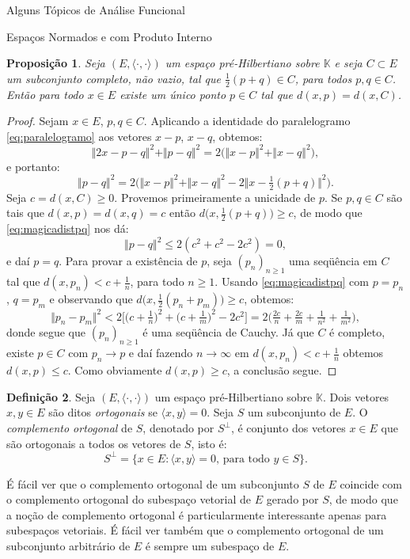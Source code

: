 \documentclass[oneside,final,11pt]{amsbook}
\newcommand{\K}{\mathds K}
\theoremstyle{remark}\newtheorem{exercise}{Exercício}[chapter]
\theoremstyle{remark}\newtheorem{*exercise}[exercise]{\hbox to 0pt{\hskip 0pt minus 1fil*}Exercício}
\theoremstyle{definition}\newtheorem{exdefin}{Definição}[chapter]
\theoremstyle{plain}\newtheorem{teo}{Teorema}[section]
\theoremstyle{plain}\newtheorem{lem}[teo]{Lema}
\theoremstyle{plain}\newtheorem{prop}[teo]{Proposição}
\theoremstyle{plain}\newtheorem{cor}[teo]{Corolário}
\theoremstyle{definition}\newtheorem{defin}[teo]{Definição}
\theoremstyle{remark}\newtheorem{rem}[teo]{Observação}
\theoremstyle{definition}\newtheorem{notation}[teo]{Notação}
\theoremstyle{definition}\newtheorem{convention}[teo]{Convenção}
\theoremstyle{definition}\newtheorem{example}[teo]{Exemplo}
\numberwithin{section}{chapter}
\numberwithin{equation}{section}
\begin{document}
\begin{chapter}{Alguns Tópicos de Análise Funcional}
\begin{section}{Espaços Normados e com Produto Interno}
\begin{prop}\label{thm:distanciaminima}
Seja $(E,\langle\cdot,\cdot\rangle)$ um espaço pré-Hilbertiano sobre $\K$ e seja $C\subset E$ um subconjunto
completo, não vazio, tal que $\frac12(p+q)\in C$, para todos $p,q\in C$. Então para todo $x\in E$ existe um único
ponto $p\in C$ tal que $d(x,p)=d(x,C)$.
\end{prop}
\begin{proof}
Sejam $x\in E$, $p,q\in C$. Aplicando a identidade do paralelogramo \eqref{eq:paralelogramo} aos vetores
$x-p$, $x-q$, obtemos:
\[\Vert2x-p-q\Vert^2+\Vert p-q\Vert^2=2\big(\Vert x-p\Vert^2+\Vert x-q\Vert^2\big),\]
e portanto:
\begin{equation}\label{eq:magicadistpq}
\Vert p-q\Vert^2=2\big(\Vert x-p\Vert^2+\Vert x-q\Vert^2-2\big\Vert x-\tfrac12(p+q)\big\Vert^2\big).
\end{equation}
Seja $c=d(x,C)\ge0$. Provemos primeiramente a unicidade de $p$. Se $p,q\in C$ são tais que $d(x,p)=d(x,q)=c$
então $d\big(x,\frac12(p+q)\big)\ge c$, de modo que \eqref{eq:magicadistpq} nos dá:
\[\Vert p-q\Vert^2\le2(c^2+c^2-2c^2)=0,\]
e daí $p=q$. Para provar a existência de $p$, seja $(p_n)_{n\ge1}$ uma seqüência em $C$ tal que
$d(x,p_n)<c+\frac1n$, para todo $n\ge1$. Usando \eqref{eq:magicadistpq} com $p=p_n$, $q=p_m$
e observando que $d\big(x,\frac12(p_n+p_m)\big)\ge c$, obtemos:
\[\Vert p_n-p_m\Vert^2<2\big[\big(c+\tfrac1n\big)^2+\big(c+\tfrac1m\big)^2-2c^2\big]
=2\big(\tfrac{2c}n+\tfrac{2c}m+\tfrac1{n^2}+\tfrac1{m^2}\big),\]
donde segue que $(p_n)_{n\ge1}$ é uma seqüência de Cauchy. Já que $C$ é completo, existe $p\in C$
com $p_n\to p$ e daí fazendo $n\to\infty$ em $d(x,p_n)<c+\frac1n$ obtemos $d(x,p)\le c$. Como
obviamente $d(x,p)\ge c$, a conclusão segue.
\end{proof}

\begin{defin}
Seja $(E,\langle\cdot,\cdot\rangle)$ um espaço pré-Hilbertiano sobre $\K$. Dois vetores $x,y\in E$ são ditos
{\em ortogonais\/} se $\langle x,y\rangle=0$. Seja $S$ um subconjunto
de $E$. O {\em complemento ortogonal\/} de $S$,
denotado por $S^\perp$, é conjunto dos vetores $x\in E$ que são
ortogonais a todos os vetores de $S$, isto é:
\[S^\perp=\big\{x\in E:\text{$\langle x,y\rangle=0$, para todo $y\in S$}\big\}.\]
\end{defin}
É fácil ver que o complemento ortogonal de um subconjunto $S$ de $E$ coincide com o complemento ortogonal
do subespaço vetorial de $E$ gerado por $S$, de modo que a noção de complemento ortogonal é particularmente interessante
apenas para subespaços vetoriais. É fácil ver também que o complemento ortogonal de um subconjunto arbitrário de $E$
é sempre um subespaço de $E$.


\end{section}
\end{chapter}
\end{document}
